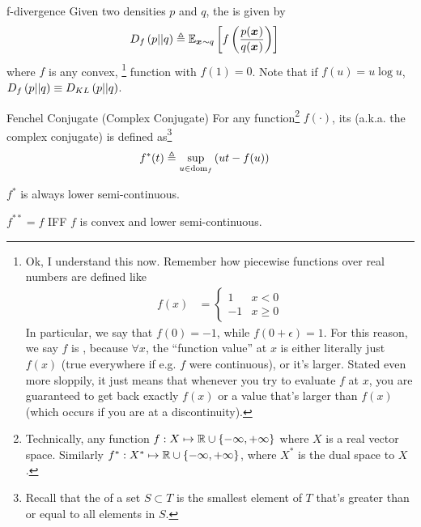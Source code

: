 \documentclass[11pt]{article}
\renewcommand\vec[2][]{\bm{#2}_{#1}}
\begin{document}
\begin{definition}{f-divergence }
	Given two densities $p$ and $q$, the  is given by
	\begin{align}
		\df{p}{q}
			&\triangleq \E[\vec x \sim q]{f\lr{
				\frac{p(\vec x)}{q(\vec x)}
		}}
	\end{align}
	where $f$ is any convex, \footnote{Ok, I understand this now. Remember how piecewise functions over real numbers are defined like
		\begin{align}
			f(x) &= 
			\begin{cases}
				1 & x < 0 \\
				-1 & x \ge 0
			\end{cases}
		\end{align}
		In particular, we say that $f(0) = -1$, while $f(0+\epsilon) = 1$. For this reason, we say $f$ is , because $\forall x$, the ``function value'' at $x$ is either literally just $f(x)$ (true everywhere if e.g. $f$ were continuous), or it's larger. Stated even more sloppily, it just means that whenever you try to evaluate $f$ at $x$, you are guaranteed to get back exactly $f(x)$ or a value that's larger than $f(x)$ (which occurs if you are at a discontinuity).
	} function with $f(1) = 0$. Note that if $f(u) = u \log u$, $D_f\left( p || q \right) \equiv D_{KL}\left( p || q \right)$.
\end{definition}

\begin{definition}{Fenchel Conjugate (Complex Conjugate)}
		For any function\footnote{Technically, any function $f : X \mapsto \mathbb{R} \cup \{ -\infty, +\infty \}$ where $X$ is a real vector space. Similarly $f^*: X^* \mapsto \mathbb{R} \cup \{-\infty, +\infty\}$, where $X^*$ is the dual space to $X$.} $f(\cdot)$, its  (a.k.a. the complex conjugate) is defined as\footnote{Recall that the  of a set $S \subset T$ is the smallest element of $T$ that's greater than or equal to all elements in $S$.}
		\begin{align}
			f^*(t)
				&\triangleq\sup_{u \in \text{dom}_f} \left(  ut - f(u)   \right) 
		\end{align}
		\begin{compactitem}
			\item $f^*$ is always lower semi-continuous. 
			\item $f^{**} = f$ IFF $f$ is convex and lower semi-continuous.
		\end{compactitem}
		
\end{definition}
\end{document}
